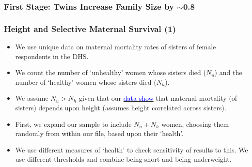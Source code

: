 \documentclass[10pt,letterpaper,subeqn]{beamer}
\begin{document}
\begin{frame}[label=Fstage2]
\frametitle{First Stage: Twins Increase Family Size by $\sim$0.8}

\hyperlink{IV}{}
\end{frame}

 \begin{frame}[label=Spain1]

\hyperlink{c}{}
\end{frame}

 \begin{frame}[label=Brazil]

\hyperlink{c}{}
\end{frame}

\begin{frame}[label=UK]
 
\hyperlink{c}{}
\end{frame}

\begin{frame}[label=Spain3]

\hyperlink{mechan}{}
\end{frame}

\begin{frame}[label=USA3]

\end{frame}

\begin{frame}

\end{frame}

\begin{frame}

\hyperlink{mechan}{}
\end{frame}


\begin{frame}[label=MMRselec]
\frametitle{Height and Selective Maternal Survival (1)} 
\begin{itemize}
\item We use unique data on maternal mortality rates of sisters of female respondents in the DHS.
\item We count the number of `unhealthy' women whose sisters died ($N_u$) and the number of `healthy' women whose sisters died ($N_h$).
\item We assume $N_u > N_h$ given that our \hyperlink{MMRcuts}{\textcolor{blue}{data show}} that maternal mortality (of sisters) depends upon height (assumes height correlated across sisters).
\item First, we expand our sample to include $N_u + N_h$ women, choosing them randomly from within our file, based upon their `health'.
\item We use different measures of `health' to check sensitivity of results to this. We use different thresholds and combine being short and being underweight.
\end{itemize}
\end{frame}
\end{document}
